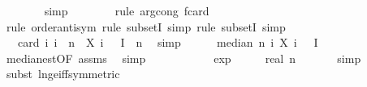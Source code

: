 \begin{isabellebody}
\ \ \ \ \ \ \isamarkupfalse%
\ {\isacharparenleft}{\kern0pt}simp{\isacharparenright}{\kern0pt}\isanewline
\ \ \ \ \ \ \isamarkupfalse%
\ {\isacharparenleft}{\kern0pt}rule\ arg{\isacharunderscore}{\kern0pt}cong{\isacharbrackleft}{\kern0pt}\ f{\isacharequal}{\kern0pt}{\isachardoublequoteopen}card{\isachardoublequoteclose}{\isacharbrackright}{\kern0pt}{\isacharparenright}{\kern0pt}\isanewline
\ \ \ \ \ \ \isamarkupfalse%
\ {\isacharparenleft}{\kern0pt}rule\ order{\isacharunderscore}{\kern0pt}antisym{\isacharcomma}{\kern0pt}\ rule\ subsetI{\isacharcomma}{\kern0pt}\ simp{\isacharcomma}{\kern0pt}\ rule\ subsetI{\isacharcomma}{\kern0pt}\ simp{\isacharparenright}{\kern0pt}\isanewline
\ \ \ \ \isamarkupfalse%
\ \isamarkupfalse%
\ {\isachardoublequoteopen}{}\ {\isacharasterisk}{\kern0pt}\ card\ {\isacharbraceleft}{\kern0pt}i{\isachardot}{\kern0pt}\ i\ {\isacharless}{\kern0pt}\ n\ {\isasymand}\ X\ i\ {\isasymomega}\ {\isasymin}\ I{\isacharbraceright}{\kern0pt}\ {\isachargreater}{\kern0pt}\ n{\isachardoublequoteclose}\ \isamarkupfalse%
\ simp\isanewline
\ \ \ \ \isamarkupfalse%
\ {\isachardoublequoteopen}median\ n\ {\isacharparenleft}{\kern0pt}{\isasymlambda}i{\isachardot}{\kern0pt}\ X\ i\ {\isasymomega}{\isacharparenright}{\kern0pt}\ {\isasymin}\ I{\isachardoublequoteclose}\isanewline
\ \ \ \ \ \ \isamarkupfalse%
\ median{\isacharunderscore}{\kern0pt}est{\isacharbrackleft}{\kern0pt}OF\ assms{\isacharparenleft}{\kern0pt}{}{\isacharparenright}{\kern0pt}{\isacharbrackright}{\kern0pt}\ \isamarkupfalse%
\ simp\isanewline
\ \ \isamarkupfalse%
\isanewline
\isanewline
\ \ \isamarkupfalse%
\ {\isachardoublequoteopen}{}\ {\isacharminus}{\kern0pt}\ {\isasymepsilon}\ {\isasymle}\ {}{\isacharminus}{\kern0pt}\ exp\ {\isacharparenleft}{\kern0pt}{\isacharminus}{\kern0pt}\ {\isacharparenleft}{\kern0pt}{}\ {\isacharasterisk}{\kern0pt}\ {\isasymalpha}\ {\isacharasterisk}{\kern0pt}\ real\ n{\isacharparenright}{\kern0pt}{\isacharparenright}{\kern0pt}{\isachardoublequoteclose}\ \isanewline
\ \ \ \ \isamarkupfalse%
\ simp\isanewline
\ \ \ \ \isamarkupfalse%
\ {\isacharparenleft}{\kern0pt}subst\ ln{\isacharunderscore}{\kern0pt}ge{\isacharunderscore}{\kern0pt}iff{\isacharbrackleft}{\kern0pt}symmetric{\isacharbrackright}{\kern0pt}{\isacharparenright}{\kern0pt}\isanewline

\end{isabellebody}
